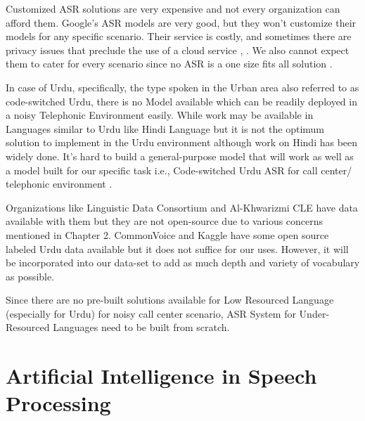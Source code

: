 Customized ASR solutions are very expensive and not every organization can afford them. Google’s ASR models are very good, but they won’t customize their models for any specific scenario. Their service is costly, and sometimes there are privacy issues \cite{zhou_security_2010} that preclude the use of a cloud service \cite{kumar_systematic_2020}, \cite{karimov_cloud_2021}. We also cannot expect them to cater for every scenario since no ASR is a one size fits all solution \cite{kincaid_brief_2018}. 

In case of Urdu, specifically, the type spoken in the Urban area also referred to as code-switched Urdu, there is no Model available which can be readily deployed in a noisy Telephonic Environment easily. While work may be available in Languages similar to Urdu like Hindi Language but it is not the optimum solution to implement in the Urdu environment although work on Hindi has been widely done. It’s hard to build a general-purpose model that will work as well as a model built for our specific task i.e., Code-switched Urdu ASR for call center/ telephonic environment \cite{kincaid_state_2018}. 

Organizations like Linguistic Data Consortium \cite{garofolo_john_s_csr-i_2007} and Al-Khwarizmi CLE \cite{noauthor_center_nodate} have data available with them but they are not open-source due to various concerns mentioned in Chapter 2. CommonVoice \cite{noauthor_mozilla_nodate} and Kaggle \cite{noauthor_kaggle_nodate} have some open source labeled Urdu data available but it does not suffice for our uses. However, it will be incorporated into our data-set to add as much depth and variety of vocabulary as possible.

Since there are no pre-built solutions available for Low Resourced Language (especially for Urdu) for noisy call center scenario, ASR System for Under-Resourced Languages need to be built from scratch.



\section{Artificial Intelligence in Speech Processing}

